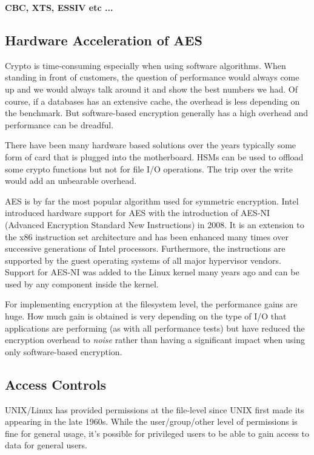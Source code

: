 \textbf{CBC, XTS, ESSIV etc ...}

\subsection{Hardware Acceleration of AES}

Crypto is time-consuming especially when using software algorithms. When standing in front of customers, the question of performance would always come up and we would always talk around it and show the best numbers we had. Of course, if a databases has an extensive cache, the overhead is less depending on the benchmark. But software-based encryption generally has a high overhead and performance can be dreadful.

There have been many hardware based solutions over the years typically some form of card that is plugged into the motherboard. HSMs can be used to offload some crypto functions but not for file I/O operations. The trip over the write would add an unbearable overhead. 

AES is by far the most popular algorithm used for symmetric encryption. Intel introduced hardware support for AES with the introduction of AES-NI (Advanced Encryption Standard New Instructions) in 2008. It is an extension to the x86 instruction set architecture and has been enhanced many times over successive generations of Intel processors. Furthermore, the instructions are supported by the guest operating systems of all major hypervisor vendors. Support for AES-NI was added to the Linux kernel many years ago and can be used by any component inside the kernel.

For implementing encryption at the filesystem level, the performance gains are huge. How much gain is obtained is very depending on the type of I/O that applications are performing (as with all performance tests) but have reduced the encryption overhead to \textit{noise} rather than having a significant impact when using only software-based encryption.

\subsection{Access Controls}

UNIX/Linux has provided permissions at the file-level since UNIX first made its appearing in the late 1960s. While the user/group/other level of permissions is fine for general usage, it's possible for privileged users to be able to gain access to data for general users.

